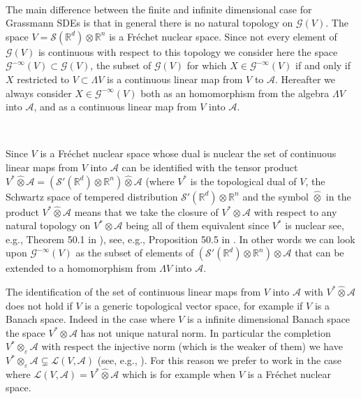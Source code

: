 \documentclass{article}
\newcommand{\asterisk}{\mathord{*}}
\begin{document}
\

The main difference between the finite and infinite dimensional case for
Grassmann SDEs is that in general there is no natural topology on $\mathcal{G}
(V)$. The space $V = \mathcal{S} (\mathbb{R}^d) \otimes \mathbb{R}^n$ is a
Fr{\'e}chet nuclear space. Since not every element of $\mathcal{G} (V)$ is
continuous with respect to this topology we consider here the space
$\mathcal{G}^{- \infty} (V) \subset \mathcal{G} (V)$, the subset of
$\mathcal{G} (V)$ for which $X \in \mathcal{G}^{- \infty} (V)$ if and only if
$X$ restricted to $V \subset \Lambda V$ is a continuous linear map from $V$ to
$\mathcal{A}$. Hereafter we always consider $X \in \mathcal{G}^{- \infty} (V)$
both as an homomorphism from the algebra $\Lambda V$ into $\mathcal{A}$, and
as a continuous linear map from $V$ into $\mathcal{A}$.

\

Since $V$ is a Fr{\'e}chet nuclear space whose dual is nuclear the set of
continuous linear maps from $V$ into $\mathcal{A}$ can be identified with the
tensor product $V^{\asterisk} \hat{\otimes} \mathcal{A} = (\mathcal{S}'
(\mathbb{R}^d) \otimes \mathbb{R}^n) \hat{\otimes} \mathcal{A}$ (where
$V^{\asterisk}$ is the topological dual of $V$, the Schwartz space of tempered
distribution $\mathcal{S}' (\mathbb{R}^d) \otimes \mathbb{R}^n$ and the symbol
$\hat{\otimes}$ in the product $V^{\ast} \hat{\otimes} \mathcal{A}$ means that
we take the closure of $V^{\ast} \otimes \mathcal{A}$ with respect to any
natural topology on $V^{\ast} \otimes \mathcal{A}$ being all of them
equivalent since $V^{\ast}$ is nuclear see, e.g., Theorem 50.1 in
{\cite{Treves}}), see, e.g., Proposition 50.5 in {\cite{Treves}}. In other
words we can look upon $\mathcal{G}^{- \infty} (V)$ as the subset of elements
of $(\mathcal{S}' (\mathbb{R}^d) \otimes \mathbb{R}^n) \otimes \mathcal{A}$
that can be extended to a homomorphism from $\Lambda V$ into $\mathcal{A}$.

\begin{remark}
  \label{remark:tensor}The identification of the set of continuous linear maps
  from $V$ into $\mathcal{A}$ with $V^{\ast} \hat{\otimes} \mathcal{A}$ does
  not hold if $V$ is a generic topological vector space, for example if $V$ is
  a Banach space. Indeed in the case where $V$ is a infinite dimensional
  Banach space the space $V^{\ast} \otimes \mathcal{A}$ has not unique natural
  norm. In particular the completion $V^{\ast} \otimes_{\varepsilon}
  \mathcal{A}$ with respect the injective norm (which is the weaker of them)
  we have $V^{\ast} \otimes_{\varepsilon} \mathcal{A} \subsetneq \mathcal{L}
  (V, \mathcal{A})$ (see, e.g., {\cite{Ryan2002}}). For this reason we prefer
  to work in the case where $\mathcal{L} (V, \mathcal{A}) = V^{\ast}
  \hat{\otimes} \mathcal{A}$ which is for example when $V$ is a Fr{\'e}chet
  nuclear space. 
\end{remark}
\end{document}
